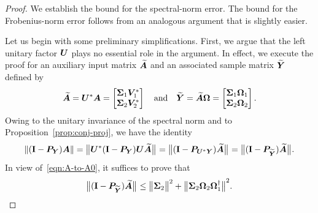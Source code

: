 \documentclass[final]{siamltex}
\newcommand{\notate}[1]{\textcolor{red}{\textbf{[#1]}}}
\begin{document}
\begin{proof}
We establish the bound for the spectral-norm error.  The bound for
the Frobenius-norm error follows from an analogous argument that
is slightly easier.


Let us begin with some preliminary simplifications.
First, we argue that the left unitary factor $\bm{U}$ plays no
essential role in the argument.  In effect, we execute
the proof for an auxiliary input matrix $\widetilde{\bm{A}}$ and
an associated sample matrix $\widetilde{\bm{Y}}$ defined by
\begin{equation} \label{eqn:aux-matrices}
\widetilde{\mtx{A}} = \mtx{U}^\adj \mtx{A} =
	\begin{bmatrix} \mtx{\Sigma}_1\mtx{V}_1^\adj \\
	\mtx{\Sigma}_2 \mtx{V}_2^\adj \end{bmatrix}
\quad\text{and}\quad
\widetilde{\mtx{Y}} = \widetilde{\mtx{A}} \mtx{\Omega} =
	\begin{bmatrix} \mtx{\Sigma}_1 \mtx{\Omega}_1 \\
	\mtx{\Sigma}_2 \mtx{\Omega}_2 \end{bmatrix}.
\end{equation}
Owing to the unitary invariance of the spectral norm and to
Proposition~\ref{prop:conj-proj}, we have the identity
\begin{equation} \label{eqn:A-to-A0}
\norm{(\Id - \mtx{P}_{\mtx{Y}}) \mtx{A}}
    = \smnorm{}{\mtx{U}^\adj (\Id - \mtx{P}_{\mtx{Y}}) \mtx{U} \widetilde{\mtx{A}}}
    = \smnorm{}{(\Id - \mtx{P}_{\mtx{U}^\adj \mtx{Y}}) \widetilde{\mtx{A}} }
    = \smnorm{}{(\Id - \mtx{P}_{\widetilde{\mtx{Y}}}) \widetilde{\mtx{A}} }.
\end{equation}
In view of~\eqref{eqn:A-to-A0}, it suffices to prove that
\begin{equation} \label{eqn:aux-error-bd}
\smnorm{}{(\Id - \mtx{P}_{\widetilde{\mtx{Y}}}) \widetilde{\mtx{A}} }
	\leq \smnorm{}{\mtx{\Sigma}_2}^2 + \smnorm{}{\mtx{\Sigma}_2\mtx{\Omega}_2 \mtx{\Omega}_1^\psinv}^2.
\end{equation}



\end{proof}
\end{document}
